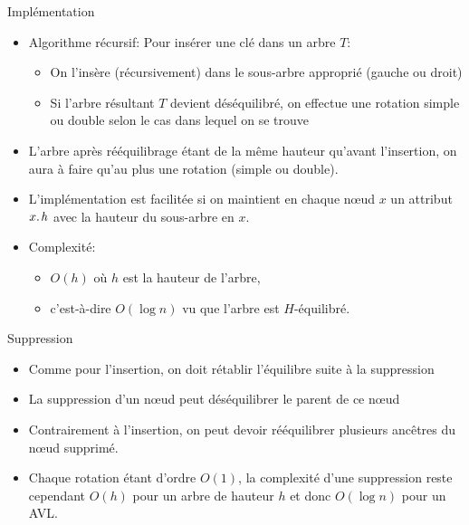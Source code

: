 \begin{frame}{Implémentation}
\begin{itemize}
\item Algorithme récursif: Pour insérer une clé dans un arbre $T$:
\begin{itemize}
\item On l'insère (récursivement) dans le sous-arbre approprié (gauche ou droit)
\item Si l'arbre résultant $T$ devient déséquilibré, on effectue une rotation simple ou double selon le cas dans lequel on se trouve
\end{itemize}
\item L'arbre après rééquilibrage étant de la même hauteur qu'avant l'insertion, on aura à faire qu'au plus une rotation (simple ou double). 
\item L'implémentation est facilitée si on maintient en chaque n\oe ud $x$ un attribut $\attrib{x}{h}$ avec la hauteur du sous-arbre en $x$.
\item Complexité:
\begin{itemize}
\item $O(h)$ où $h$ est la hauteur de l'arbre,
\item c'est-à-dire $O(\log n)$ vu que l'arbre est $H$-équilibré.
\end{itemize}
\end{itemize}
\end{frame}

\begin{frame}{Suppression}
\begin{itemize}
\item Comme pour l'insertion, on doit rétablir l'équilibre suite à la suppression
\item La suppression d'un n\oe ud peut déséquilibrer le parent de ce n\oe ud
\item Contrairement à l'insertion, on peut devoir rééquilibrer plusieurs ancêtres du n\oe ud supprimé.
\item Chaque rotation étant d'ordre $O(1)$, la complexité d'une suppression reste cependant $O(h)$ pour un arbre de hauteur $h$ et donc $O(\log n)$ pour un AVL.
\end{itemize}
\end{frame}


